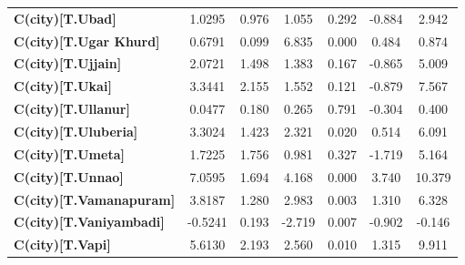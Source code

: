 \begin{center}
\begin{tabular}{lcccccc}
\textbf{C(city)[T.Ubad]}                                                                            &       1.0295  &        0.976     &     1.055  &         0.292        &       -0.884    &        2.942     \\
\textbf{C(city)[T.Ugar Khurd]}                                                                      &       0.6791  &        0.099     &     6.835  &         0.000        &        0.484    &        0.874     \\
\textbf{C(city)[T.Ujjain]}                                                                          &       2.0721  &        1.498     &     1.383  &         0.167        &       -0.865    &        5.009     \\
\textbf{C(city)[T.Ukai]}                                                                            &       3.3441  &        2.155     &     1.552  &         0.121        &       -0.879    &        7.567     \\
\textbf{C(city)[T.Ullanur]}                                                                         &       0.0477  &        0.180     &     0.265  &         0.791        &       -0.304    &        0.400     \\
\textbf{C(city)[T.Uluberia]}                                                                        &       3.3024  &        1.423     &     2.321  &         0.020        &        0.514    &        6.091     \\
\textbf{C(city)[T.Umeta]}                                                                           &       1.7225  &        1.756     &     0.981  &         0.327        &       -1.719    &        5.164     \\
\textbf{C(city)[T.Unnao]}                                                                           &       7.0595  &        1.694     &     4.168  &         0.000        &        3.740    &       10.379     \\
\textbf{C(city)[T.Vamanapuram]}                                                                     &       3.8187  &        1.280     &     2.983  &         0.003        &        1.310    &        6.328     \\
\textbf{C(city)[T.Vaniyambadi]}                                                                     &      -0.5241  &        0.193     &    -2.719  &         0.007        &       -0.902    &       -0.146     \\
\textbf{C(city)[T.Vapi]}                                                                            &       5.6130  &        2.193     &     2.560  &         0.010        &        1.315    &        9.911     \\

\end{tabular}
\end{center}
